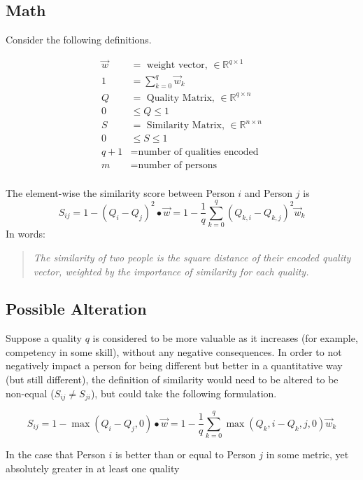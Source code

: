 \documentclass{article}
\begin{document}
\subsection{Math}

Consider the following definitions.

\begin{align}
\vec{w} &= \text{ weight vector, } \in \mathbb{R}^{q \times 1} \\
1 &= \sum_{k=0}^{q} \vec{w}_k\\
Q &= \text{ Quality Matrix, } \in \mathbb{R}^{q \times n} \\
0 & \leq Q \leq 1 \\
S &= \text{ Similarity Matrix, } \in \mathbb{R}^{n \times n} \\
0 & \leq S \leq 1 \\
q + 1 &= \text{number of qualities encoded}\\
m &= \text{number of persons}\\
\end{align}

The element-wise the similarity score between Person $i$ and Person $j$ is
\[S_{ij} = 1- (Q_i - Q_j)^2\bullet \vec{w} =  1 - \frac{1}{q}\sum_{k=0}^{q} (Q_{k,i} - Q_{k,j})^2\vec{w}_k\]
In words:
\begin{quote}
\textit{The similarity of two people is the square distance of their encoded quality vector, weighted by the importance of similarity for each quality.}
\end{quote}

\subsection{Possible Alteration}

Suppose a quality $q$ is considered to be more valuable as it increases (for example, competency in some skill), without any negative consequences. In order to not negatively impact a person for being different but better in a quantitative way (but still different), the definition of similarity would need to be altered to be non-equal ($S_{ij} \neq S_{ji}$), but could take the following formulation.

\[S_{ij} = 1- \max(Q_i - Q_j, 0) \bullet \vec{w} =  1 - \frac{1}{q}\sum_{k=0}^{q} \max(Q_k,i - Q_k,j, 0)\vec{w}_k\]

In the case that Person $i$ is better than or equal to Person $j$ in some metric, yet absolutely greater in at least one quality
\end{document}
